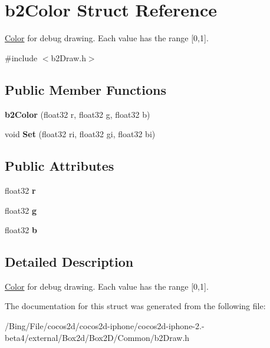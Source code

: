 \hypertarget{structb2_color}{\section{b2\-Color Struct Reference}
\label{structb2_color}
}


\hyperlink{struct_color}{Color} for debug drawing. Each value has the range \mbox{[}0,1\mbox{]}.  




{\ttfamily \#include $<$b2\-Draw.\-h$>$}

\subsection*{Public Member Functions}
\begin{DoxyCompactItemize}
\item 
\hypertarget{structb2_color_abddfc60d402d691542a224921868bfb7}{{\bfseries b2\-Color} (float32 r, float32 g, float32 b)}\label{structb2_color_abddfc60d402d691542a224921868bfb7}

\item 
\hypertarget{structb2_color_af35a718911e10a54fa8aaa86367a5b56}{void {\bfseries Set} (float32 ri, float32 gi, float32 bi)}\label{structb2_color_af35a718911e10a54fa8aaa86367a5b56}

\end{DoxyCompactItemize}
\subsection*{Public Attributes}
\begin{DoxyCompactItemize}
\item 
\hypertarget{structb2_color_a9ab6c9a910caee177d96980b74ffb00b}{float32 {\bfseries r}}\label{structb2_color_a9ab6c9a910caee177d96980b74ffb00b}

\item 
\hypertarget{structb2_color_a241c742352403ec456b51ac5f2abe7d9}{float32 {\bfseries g}}\label{structb2_color_a241c742352403ec456b51ac5f2abe7d9}

\item 
\hypertarget{structb2_color_a9e7380d27a63010cfad49b97f66dcd26}{float32 {\bfseries b}}\label{structb2_color_a9e7380d27a63010cfad49b97f66dcd26}

\end{DoxyCompactItemize}


\subsection{Detailed Description}
\hyperlink{struct_color}{Color} for debug drawing. Each value has the range \mbox{[}0,1\mbox{]}. 

The documentation for this struct was generated from the following file\-:\begin{DoxyCompactItemize}
\item 
/\-Bing/\-File/cocos2d/cocos2d-\/iphone/cocos2d-\/iphone-\/2.-\/beta4/external/\-Box2d/\-Box2\-D/\-Common/b2\-Draw.\-h\end{DoxyCompactItemize}
